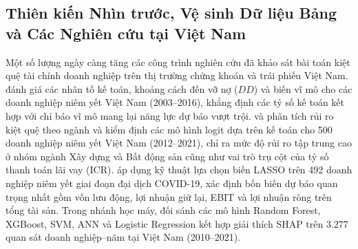 \documentclass[11pt,a4paper]{article}
\begin{document}
\subsection{Thiên kiến Nhìn trước, Vệ sinh Dữ liệu Bảng và Các Nghiên cứu tại Việt Nam}
Một số lượng ngày càng tăng các công trình nghiên cứu đã khảo sát bài toán kiệt quệ tài chính doanh nghiệp trên thị trường chứng khoán và trái phiếu Việt Nam. \citet{pham2018financial} đánh giá các nhân tố kế toán, khoảng cách đến vỡ nợ ($DD$) và biến vĩ mô cho các doanh nghiệp niêm yết Việt Nam (2003--2016), khẳng định các tỷ số kế toán kết hợp với chỉ báo vĩ mô mang lại năng lực dự báo vượt trội. \citet{vo2019corporate} và \citet{tran2023examining} phân tích rủi ro kiệt quệ theo ngành và kiểm định các mô hình logit dựa trên kế toán cho 500 doanh nghiệp niêm yết Việt Nam (2012--2021), chỉ ra mức độ rủi ro tập trung cao ở nhóm ngành Xây dựng và Bất động sản cũng như vai trò trụ cột của tỷ số thanh toán lãi vay ($\text{ICR}$). \citet{vu2023lasso} áp dụng kỹ thuật lựa chọn biến LASSO trên 492 doanh nghiệp niêm yết giai đoạn đại dịch COVID-19, xác định bốn biến dự báo quan trọng nhất gồm vốn lưu động, lợi nhuận giữ lại, EBIT và lợi nhuận ròng trên tổng tài sản. Trong nhánh học máy, \citet{tran2022explainable} đối sánh các mô hình Random Forest, XGBoost, SVM, ANN và Logistic Regression kết hợp giải thích SHAP trên $3.277$ quan sát doanh nghiệp--năm tại Việt Nam (2010--2021).
\end{document}
